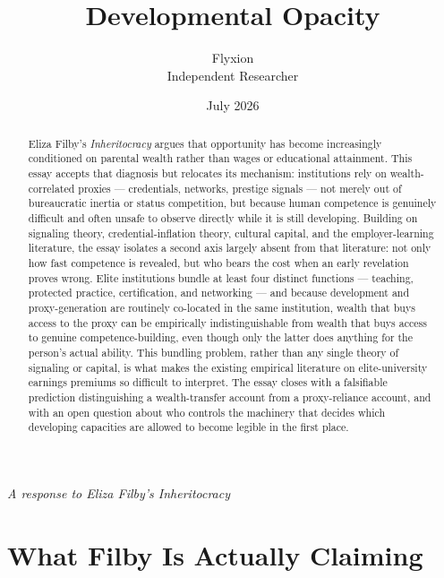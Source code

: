 \documentclass[11pt]{article}
\title{Developmental Opacity}
\author{Flyxion \\ \small Independent Researcher}
\date{July 2026}
\begin{document}
\maketitle
\begin{center}
\textit{A response to Eliza Filby's \emph{Inheritocracy}}
\end{center}

\vspace{1em}

\begin{abstract}
\noindent Eliza Filby's \emph{Inheritocracy} argues that opportunity has become increasingly conditioned on parental wealth rather than wages or educational attainment. This essay accepts that diagnosis but relocates its mechanism: institutions rely on wealth-correlated proxies --- credentials, networks, prestige signals --- not merely out of bureaucratic inertia or status competition, but because human competence is genuinely difficult and often unsafe to observe directly while it is still developing. Building on signaling theory, credential-inflation theory, cultural capital, and the employer-learning literature, the essay isolates a second axis largely absent from that literature: not only how fast competence is revealed, but who bears the cost when an early revelation proves wrong. Elite institutions bundle at least four distinct functions --- teaching, protected practice, certification, and networking --- and because development and proxy-generation are routinely co-located in the same institution, wealth that buys access to the proxy can be empirically indistinguishable from wealth that buys access to genuine competence-building, even though only the latter does anything for the person's actual ability. This bundling problem, rather than any single theory of signaling or capital, is what makes the existing empirical literature on elite-university earnings premiums so difficult to interpret. The essay closes with a falsifiable prediction distinguishing a wealth-transfer account from a proxy-reliance account, and with an open question about who controls the machinery that decides which developing capacities are allowed to become legible in the first place.
\end{abstract}

\newpage

\section{What Filby Is Actually Claiming}
\end{document}
